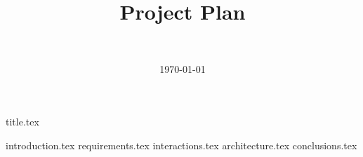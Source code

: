 \documentclass[final]{report}
\title{Project Plan}
\author{~}
\date{\today}
\begin{document}

{title.tex}
\newpage
\tableofcontents

\newpage
{}
{introduction.tex}
{requirements.tex}
{interactions.tex}
{architecture.tex}
{conclusions.tex}
\newpage
{}

\end{document}
